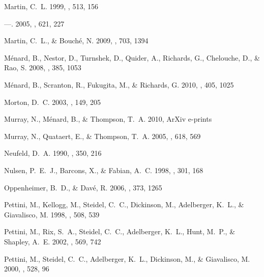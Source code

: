 \documentclass[]{emulateapj}
\begin{document}
\begin{thebibliography}{74}
{Martin}, C.~L. 1999, \apj, 513, 156

---. 2005, \apj, 621, 227

{Martin}, C.~L., \& {Bouch{\'e}}, N. 2009, \apj, 703, 1394

{M{\'e}nard}, B., {Nestor}, D., {Turnshek}, D., {Quider}, A., {Richards}, G.,
  {Chelouche}, D., \& {Rao}, S. 2008, \mnras, 385, 1053

{M{\'e}nard}, B., {Scranton}, R., {Fukugita}, M., \& {Richards}, G. 2010,
  \mnras, 405, 1025

{Morton}, D.~C. 2003, \apjs, 149, 205

{Murray}, N., {M{\'e}nard}, B., \& {Thompson}, T.~A. 2010, ArXiv e-prints

{Murray}, N., {Quataert}, E., \& {Thompson}, T.~A. 2005, \apj, 618, 569

{Neufeld}, D.~A. 1990, \apj, 350, 216

{Nulsen}, P.~E.~J., {Barcons}, X., \& {Fabian}, A.~C. 1998, \mnras, 301, 168

{Oppenheimer}, B.~D., \& {Dav{\'e}}, R. 2006, \mnras, 373, 1265

{Pettini}, M., {Kellogg}, M., {Steidel}, C.~C., {Dickinson}, M., {Adelberger},
  K.~L., \& {Giavalisco}, M. 1998, \apj, 508, 539

{Pettini}, M., {Rix}, S.~A., {Steidel}, C.~C., {Adelberger}, K.~L., {Hunt},
  M.~P., \& {Shapley}, A.~E. 2002, \apj, 569, 742

{Pettini}, M., {Steidel}, C.~C., {Adelberger}, K.~L., {Dickinson}, M., \&
  {Giavalisco}, M. 2000, \apj, 528, 96


\end{thebibliography}
\end{document}
